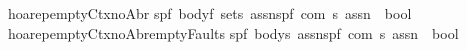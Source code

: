 \begin{isabellebody}
\isanewline
{\isachardoublequoteopen}{\isacharunderscore}hoarep{\isacharunderscore}emptyCtx{\isacharunderscore}noAbr{\isachardoublequoteclose}{\isacharcolon}{\isacharcolon}\isanewline
{\isachardoublequoteopen}{\isacharbrackleft}{\isacharparenleft}{\isacharprime}s{\isacharcomma}{\isacharprime}p{\isacharcomma}{\isacharprime}f{\isacharparenright}\ body{\isacharcomma}{\isacharprime}f\ set{\isacharcomma}{\isacharprime}s\ assn{\isacharcomma}{\isacharparenleft}{\isacharprime}s{\isacharcomma}{\isacharprime}p{\isacharcomma}{\isacharprime}f{\isacharparenright}\ com{\isacharcomma}\ {\isacharprime}s\ assn{\isacharbrackright}\ {\isacharequal}{\isachargreater}\ bool{\isachardoublequoteclose}\isanewline
\ \ \ \ {\isacharparenleft}{\isachardoublequoteopen}{\isacharparenleft}{}{\isacharunderscore}{\isacharslash}{\isasymturnstile}\isactrlbsub {\isacharprime}{\isacharslash}{\isacharunderscore}\isactrlesub \ {\isacharparenleft}{\isacharunderscore}{\isacharslash}\ {\isacharparenleft}{\isacharunderscore}{\isacharparenright}{\isacharslash}\ {\isacharunderscore}{\isacharparenright}{\isacharparenright}{\isachardoublequoteclose}\ {\isacharbrackleft}{}{}{\isacharcomma}{}{}{\isacharcomma}{}{}{}{}{\isacharcomma}{}{}{\isacharcomma}{}{}{}{}{\isacharbrackright}{}{}{\isacharparenright}\isanewline
\isanewline
{\isachardoublequoteopen}{\isacharunderscore}hoarep{\isacharunderscore}emptyCtx{\isacharunderscore}noAbr{\isacharunderscore}emptyFaults{\isachardoublequoteclose}{\isacharcolon}{\isacharcolon}\isanewline
{\isachardoublequoteopen}{\isacharbrackleft}{\isacharparenleft}{\isacharprime}s{\isacharcomma}{\isacharprime}p{\isacharcomma}{\isacharprime}f{\isacharparenright}\ body{\isacharcomma}{\isacharprime}s\ assn{\isacharcomma}{\isacharparenleft}{\isacharprime}s{\isacharcomma}{\isacharprime}p{\isacharcomma}{\isacharprime}f{\isacharparenright}\ com{\isacharcomma}\ {\isacharprime}s\ assn{\isacharbrackright}\ {\isacharequal}{\isachargreater}\ bool{\isachardoublequoteclose}\isanewline
\ \ \ \ {\isacharparenleft}{\isachardoublequoteopen}{\isacharparenleft}{}{\isacharunderscore}{\isacharslash}{\isasymturnstile}\ {\isacharparenleft}{\isacharunderscore}{\isacharslash}\ {\isacharparenleft}{\isacharunderscore}{\isacharparenright}{\isacharslash}\ {\isacharunderscore}{\isacharparenright}{\isacharparenright}{\isachardoublequoteclose}\ {\isacharbrackleft}{}{}{\isacharcomma}{}{}{}{}{\isacharcomma}{}{}{\isacharcomma}{}{}{}{}{\isacharbrackright}{}{}{\isacharparenright}\isanewline

\end{isabellebody}
